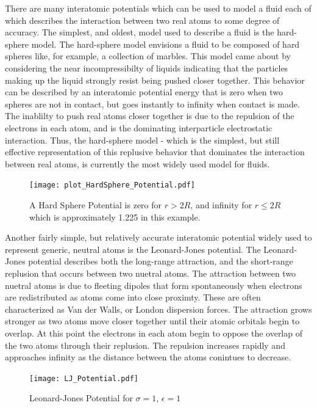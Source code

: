 \documentclass[double,12pt]{beavtex}
\begin{document}
There are many interatomic potentials which can be used to model a fluid each of which describes the interaction between two real atoms to some degree of accuracy. The simplest, and oldest, model used to describe a fluid is the hard-sphere model. The hard-sphere model envisions a fluid to be composed of hard spheres like, for example, a collection of marbles. This model came about by considering the near incompressibilty of liquids indicating that the particles making up the liquid strongly resist being pushed closer together. This behavior can be described by an interatomic potential energy that is zero when two spheres are not in contact, but goes instantly to infinity when contact is made. The inablilty to push real atoms closer together is due to the repulsion of the electrons in each atom, and is the dominating interparticle electrostatic interaction. Thus, the hard-sphere model - which is the simplest, but still effective representation of this replusive behavior that dominates the interaction between real atoms, is currently the most widely used model for fluids.

\begin{figure}[h!]
    \centering
    \texttt{[image: plot\_HardSphere\_Potential.pdf]}
    \caption{A Hard Sphere Potential is zero for $r>2R$, and infinity for $r\leq{2R}$ which is approximately 1.225 in this example.}
    \label{fig:HardSphere_potential}
  \end{figure}

Another fairly simple, but relatively accurate interatomic potential widely used to represent generic, neutral atoms is the Leonard-Jones potential. The Leonard-Jones potential describes both the long-range attraction, and the short-range replusion that occurs between two nuetral atoms. The attraction between two nuetral atoms is due to fleeting dipoles that form spontaneously when electrons are redistributed as atoms come into close proximty. These are often characterized as Van der Walls, or London dispersion forces. The attraction grows stronger as two atoms move closer together until their atomic orbitals begin to overlap. %
At this point the electrons in each atom begin to oppose the overlap of the two atoms through their replusion. The repulsion increases rapidly and approaches infinity as the distance between the atoms conintues to decrease.  
 
\begin{figure}[h!]
    \centering
    \texttt{[image: LJ\_Potential.pdf]}
    \caption{Leonard-Jones Potential for $\sigma=1$, $\epsilon=1$}
    \label{fig:LJ_potential}
  \end{figure}
\end{document}
